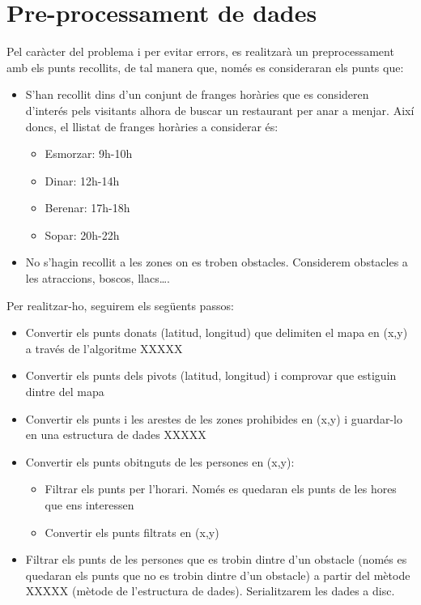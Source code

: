 \documentclass[12pt]{article}
\begin{document}
\section{Pre-processament de dades\label{pd}}
Pel caràcter del problema i per evitar errors, es realitzarà un preprocessament amb els punts recollits, de tal manera que, només es consideraran els punts que:
\begin{itemize}
	\item S’han recollit dins d’un conjunt de franges horàries que es consideren d'interés pels visitants alhora de buscar un restaurant per anar a menjar. 
	Així doncs, el llistat de franges horàries a considerar és:
	\begin{itemize}
		\item Esmorzar: 9h-10h
		\item Dinar: 12h-14h
		\item Berenar: 17h-18h
		\item Sopar: 20h-22h
	\end{itemize}

	\item No s’hagin recollit a les zones on es troben obstacles. 
	Considerem obstacles a les atraccions, boscos, llacs….
\end{itemize}

Per realitzar-ho, seguirem els següents passos:
\begin{itemize}
	\item Convertir els punts donats (latitud, longitud) que delimiten el mapa en (x,y) a través de l'algoritme XXXXX
	\item Convertir els punts dels pivots (latitud, longitud) i comprovar que estiguin dintre del mapa
	\item Convertir els punts i les arestes de les zones prohibides en (x,y) i guardar-lo en una estructura de dades XXXXX
	\item Convertir els punts obitnguts de les persones en (x,y):
	\begin{itemize}
		\item Filtrar els punts per l'horari. Només es quedaran els punts de les hores que ens interessen
		\item Convertir els punts filtrats en (x,y)
	\end{itemize}
	\item Filtrar els punts de les persones que es trobin dintre d'un obstacle (només es quedaran els punts que no es trobin dintre d'un obstacle) a partir del mètode XXXXX (mètode de l'estructura de dades). Serialitzarem les dades a disc.
\end{itemize}
\end{document}
